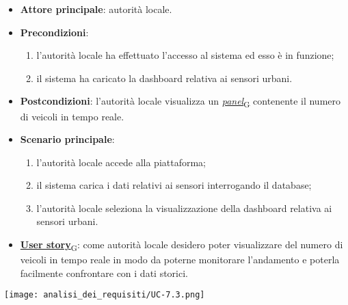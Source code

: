 \begin{itemize}
	\item \textbf{Attore principale}: autorità locale.
	\item \textbf{Precondizioni}:
	      \begin{enumerate}
		      \item l'autorità locale ha effettuato l'accesso al sistema ed esso è in funzione;
		      \item il sistema ha caricato la dashboard relativa ai sensori urbani.
	      \end{enumerate}
	\item \textbf{Postcondizioni}: l'autorità locale visualizza un \href{https://7last.github.io/docs/rtb/documentazione-interna/glossario\#panel}{\textit{panel}\textsubscript{G}} contenente il numero di veicoli in tempo reale.
	\item \textbf{Scenario principale}:
	      \begin{enumerate}
		      \item l'autorità locale accede alla piattaforma;
		      \item il sistema carica i dati relativi ai sensori interrogando il database;
		      \item l'autorità locale seleziona la visualizzazione della dashboard relativa ai sensori urbani.
	      \end{enumerate}
	\item \href{https://7last.github.io/docs/rtb/documentazione-interna/glossario\#user-story}{\textbf{User story}\textsubscript{G}}:
	      come autorità locale desidero poter visualizzare del numero di veicoli in tempo reale in modo da poterne monitorare l'andamento
	      e poterla facilmente confrontare con i dati storici.
\end{itemize}
\begin{center}
	\texttt{[image: analisi\_dei\_requisiti/UC-7.3.png]}
\end{center}


